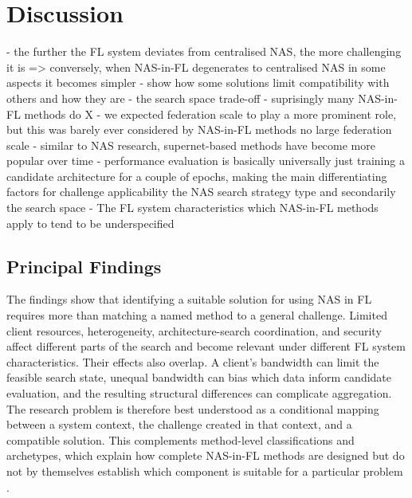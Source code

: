 \chapter{Discussion}\label{chapter:discussion}

- the further the FL system deviates from centralised NAS, the more challenging it is 
    => conversely, when NAS-in-FL degenerates to centralised NAS in some aspects it becomes simpler
- show how some solutions limit compatibility with others and how they are 
- the search space trade-off
- suprisingly many NAS-in-FL methods do X
- we expected federation scale to play a more prominent role, but this was barely ever considered by NAS-in-FL methods no large federation scale
- similar to NAS research, supernet-based methods have become more popular over time
- performance evaluation is basically universally just training a candidate architecture for a couple of epochs, making the main differentiating factors for challenge applicability the NAS search strategy type and secondarily the search space 
- The FL system characteristics which NAS-in-FL methods apply to tend to be underspecified

\section{Principal Findings}

The findings show that identifying a suitable solution for using NAS in FL requires more than matching a named method to a general challenge. Limited client resources, heterogeneity, architecture-search coordination, and security affect different parts of the search and become relevant under different FL system characteristics. Their effects also overlap. A client's bandwidth can limit the feasible search state, unequal bandwidth can bias which data inform candidate evaluation, and the resulting structural differences can complicate aggregation. The research problem is therefore best understood as a conditional mapping between a system context, the challenge created in that context, and a compatible solution. This complements method-level classifications and archetypes, which explain how complete NAS-in-FL methods are designed but do not by themselves establish which component is suitable for a particular problem \cite{nas_in_fl_2026}.

